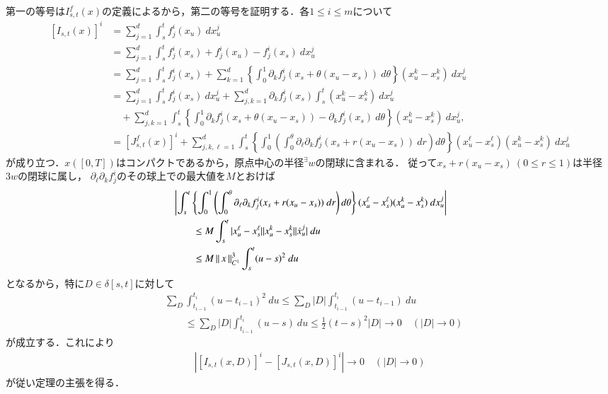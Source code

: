 	\begin{prf}
		第一の等号は$I^f_{s,t}(x)$の定義によるから，第二の等号を証明する．各$1 \leq i \leq m$について
		\begin{align}
			\left[ I_{s,t}(x) \right]^i
			&= \sum_{j=1}^d \int_s^t f_j^i(x_u)\ dx^j_u \\
			&= \sum_{j=1}^d \int_s^t f_j^i(x_s) + f_j^i(x_u) - f_j^i(x_s)\ dx^j_u \\
			&= \sum_{j=1}^d \int_s^t f_j^i(x_s) 
				+ \sum_{k=1}^d  \left\{ \int_0^1 \partial_k f_j^i(x_s + \theta(x_u - x_s))\ d\theta \right\} (x^k_u - x^k_s)\ dx^j_u \\
			&= \sum_{j=1}^d \int_s^t f_j^i(x_s)\ dx^j_u + \sum_{j,k=1}^d \partial_k f_j^i(x_s) \int_s^t (x^k_u - x^k_s)\ dx^j_u \\
				&\quad + \sum_{j,k=1}^d \int_s^t 
				\left\{ \int_0^1 \partial_k f_j^i(x_s + \theta(x_u - x_s)) - \partial_k f_j^i(x_s)\ d\theta \right\} (x^k_u - x^k_s)\ dx^j_u, \\
			&= \left[ J^f_{s,t}(x) \right]^i
				+ \sum_{j,k,\ell=1}^d \int_s^t 
				\left\{ \int_0^1 \left( \int_0^\theta \partial_\ell \partial_k f_j^i(x_s + r(x_u - x_s))\ dr\right) d\theta \right\} (x^\ell_u - x^\ell_s)(x^k_u - x^k_s)\ dx^j_u
		\end{align}
		が成り立つ．$x([0,T])$はコンパクトであるから，原点中心の半径${}^\exists w$の閉球に含まれる．
		従って$x_s + r(x_u - x_s)\ (0 \leq r \leq 1)$は半径$3w$の閉球に属し，
		$\partial_\ell \partial_k f_j^i$のその球上での最大値を$M$とおけば
		\begin{align}
			&\left| \int_s^t 
				\left\{ \int_0^1 \left( \int_0^\theta \partial_\ell \partial_k f_j^i(x_s + r(x_u - x_s))\ dr\right) d\theta \right\} (x^\ell_u - x^\ell_s)(x^k_u - x^k_s)\ dx^j_u \right| \\
			&\qquad \leq M \int_s^t |x^\ell_u - x^\ell_s||x^k_u - x^k_s| |\dot{x}^j_u|\ du \\
			&\qquad \leq M \left\|\, x\, \right\|_{C^1}^3 \int_s^t (u - s)^2\ du
		\end{align}
		となるから，特に$D \in \delta[s,t]$に対して
		\begin{align}
			&\sum_D \int_{t_{i-1}}^{t_i} (u - t_{i-1})^2\ du
			\leq \sum_D |D| \int_{t_{i-1}}^{t_i} (u - t_{i-1})\ du \\
			&\qquad \leq \sum_D |D| \int_{t_{i-1}}^{t_i} (u - s)\ du
			\leq \frac{1}{2}(t-s)^2 |D|
			\longrightarrow 0 \quad (|D| \longrightarrow 0)
		\end{align}
		が成立する．これにより
		\begin{align}
			\left| \left[ I_{s,t}(x,D) \right]^i - \left[ J_{s,t}(x,D) \right]^i \right| \longrightarrow 0 \quad (|D| \longrightarrow 0)
		\end{align}
		が従い定理の主張を得る．
		\QED
	\end{prf}
	
	
	\begin{screen}
		\begin{thm}
		\end{thm}
	\end{screen}
	
	\begin{screen}
		\begin{thm}
		\end{thm}
	\end{screen}